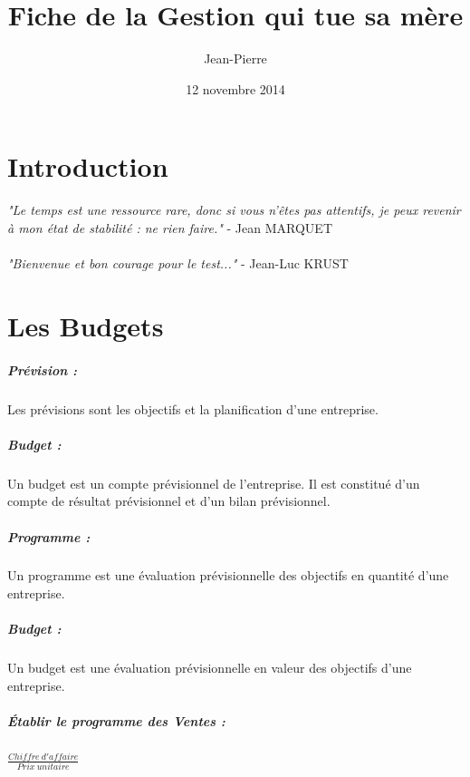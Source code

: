 \documentclass{report}
\title{\textbf{{\huge Fiche de la Gestion qui tue sa mère}}}
\author{Jean-Pierre \bsc{Mohamed}}
\date{12 novembre 2014}
\begin{document}
 
\maketitle

\chapter{Introduction}

\emph{"Le temps est une ressource rare, donc si vous n'êtes pas attentifs, je peux revenir à mon état de stabilité : ne rien faire."} - Jean MARQUET
\\ \\

\emph{"Bienvenue et bon courage pour le test..."} - Jean-Luc KRUST

\chapter{Les Budgets}

\paragraph*{Prévision :} Les prévisions sont les objectifs et la planification d'une entreprise.

\paragraph*{Budget :} Un budget est  un compte prévisionnel de l'entreprise. Il est constitué d'un compte de résultat prévisionnel et d'un bilan prévisionnel.

\paragraph*{Programme :}
Un programme est une évaluation prévisionnelle des objectifs en quantité d'une entreprise.

\paragraph*{Budget : }
Un budget est une évaluation prévisionnelle en valeur des objectifs d'une entreprise.

\paragraph*{Établir le programme des Ventes :}
{\Large$ \frac{Chiffre\ d'affaire}{Prix\ unitaire} $}
\end{document}
